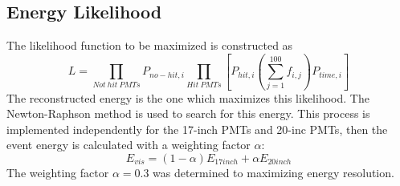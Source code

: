 \subsection*{Energy Likelihood}
The likelihood function to be maximized is constructed as 
\begin{equation}
	L=\prod_{Not\ hit\ PMTs}P_{no-hit,i}\prod_{Hit\ PMTs}\left[P_{hit,i}\left(\sum_{j=1}^{100}f_{i,j}\right)P_{time, i}\right]
	\label{eq:energy_likelihood}
\end{equation}
The reconstructed energy is the one which maximizes this likelihood. The Newton-Raphson method is used to search for this energy. This process is implemented independently for the 17-inch PMTs and 20-inc PMTs, then the event energy is calculated with a weighting factor $\alpha$:
\begin{equation}
	E_{vis}=(1-\alpha)E_{17inch}+\alpha E_{20inch}
\end{equation}
The weighting factor $\alpha=0.3$ was determined to maximizing energy resolution.
